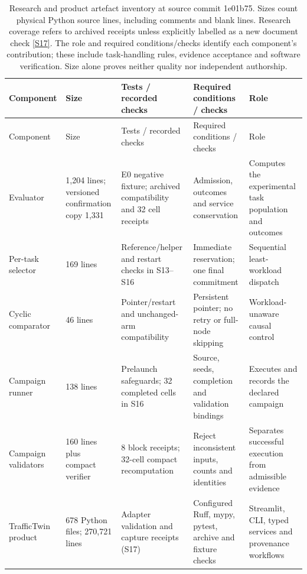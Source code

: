 \documentclass[12pt,a4paper]{article}
\begin{document}
\begingroup
\singlespacing\footnotesize\setlength{\tabcolsep}{3pt}
\begin{xltabular}{\textwidth}{@{}YYYYY@{}}
\caption[Software components and checks]{Research and product artefact inventory at source commit 1e01b75. Sizes count physical Python source lines, including comments and blank lines. Research coverage refers to archived receipts unless explicitly labelled as a new document check \hyperref[source-s17]{[S17]}. The role and required conditions/checks identify each component's contribution; these include task-handling rules, evidence acceptance and software verification. Size alone proves neither quality nor independent authorship.}\label{tab:A1} \\
\toprule
Component & Size & Tests / recorded checks & Required conditions / checks & Role \\
\midrule\endfirsthead
\toprule
Component & Size & Tests / recorded checks & Required conditions / checks & Role \\
\midrule\endhead
\bottomrule\endfoot
Evaluator & 1,204 lines; versioned confirmation copy 1,331 & E0 negative fixture; archived compatibility and 32 cell receipts & Admission, outcomes and service conservation & Computes the experimental task population and outcomes \\
Per-task selector & 169 lines & Reference/helper and restart checks in S13--S16 & Immediate reservation; one final commitment & Sequential least-workload dispatch \\
Cyclic comparator & 46 lines & Pointer/restart and unchanged-arm compatibility & Persistent pointer; no retry or full-node skipping & Workload-unaware causal control \\
Campaign runner & 138 lines & Prelaunch safeguards; 32 completed cells in S16 & Source, seeds, completion and validation bindings & Executes and records the declared campaign \\
Campaign validators & 160 lines plus compact verifier & 8 block receipts; 32-cell compact recomputation & Reject inconsistent inputs, counts and identities & Separates successful execution from admissible evidence \\
TrafficTwin product & 678 Python files; 270,721 lines & Adapter validation and capture receipts (S17) & Configured Ruff, mypy, pytest, archive and fixture checks & Streamlit, CLI, typed services and provenance workflows \\
\end{xltabular}
\endgroup
\end{document}
